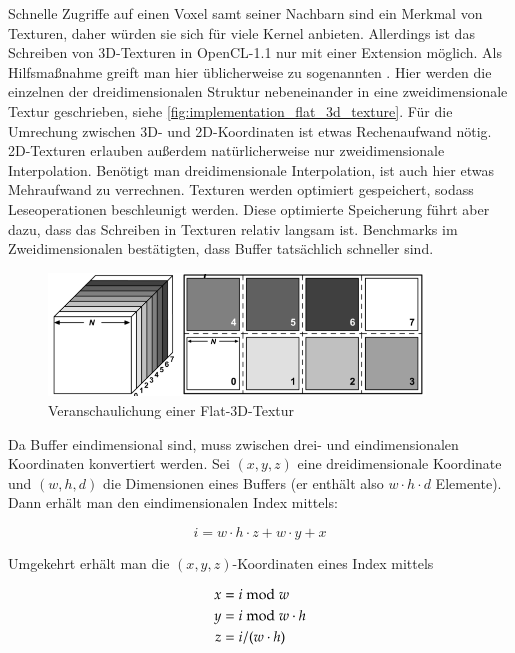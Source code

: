 Schnelle Zugriffe auf einen Voxel samt seiner Nachbarn sind ein Merkmal von
Texturen, daher würden sie sich für viele Kernel anbieten. Allerdings ist das
Schreiben von 3D-Texturen in OpenCL-1.1 nur mit einer Extension möglich. Als
Hilfsmaßnahme greift man hier üblicherweise zu sogenannten
 \cite{Harris2003}. Hier werden die einzelnen
 der dreidimensionalen Struktur nebeneinander in eine
zweidimensionale Textur geschrieben, siehe
\autoref{fig:implementation_flat_3d_texture}. Für die Umrechung zwischen 3D- und
2D-Koordinaten ist etwas Rechenaufwand nötig. 2D-Texturen erlauben außerdem
natürlicherweise nur zweidimensionale Interpolation. Benötigt man
dreidimensionale Interpolation, ist auch hier etwas Mehraufwand zu verrechnen.
Texturen werden optimiert gespeichert, sodass Leseoperationen beschleunigt
werden. Diese optimierte Speicherung führt aber dazu, dass das Schreiben in
Texturen relativ langsam ist. Benchmarks im Zweidimensionalen bestätigten, dass
Buffer tatsächlich schneller sind.

\begin{figure}[ht]
\centering
\includegraphics[width=10cm]{images/flat_3d_texture}
\caption{Veranschaulichung einer Flat-3D-Textur}
\label{fig:implementation_flat_3d_texture}
\end{figure}

Da Buffer eindimensional sind, muss zwischen drei- und eindimensionalen
Koordinaten konvertiert werden. Sei $(x,y,z)$ eine dreidimensionale Koordinate
und $(w,h,d)$ die Dimensionen eines Buffers (er enthält also $w \cdot h \cdot d$
Elemente). Dann erhält man den eindimensionalen Index mittels:

\begin{equation}
i = w \cdot h \cdot z + w \cdot y + x
\end{equation}

Umgekehrt erhält man die $(x,y,z)$-Koordinaten eines Index mittels

\begin{align*}
x &= i \bmod w \\
y &= i \bmod w \cdot h \\
z &= i / (w \cdot h)  \\
\end{align*}

